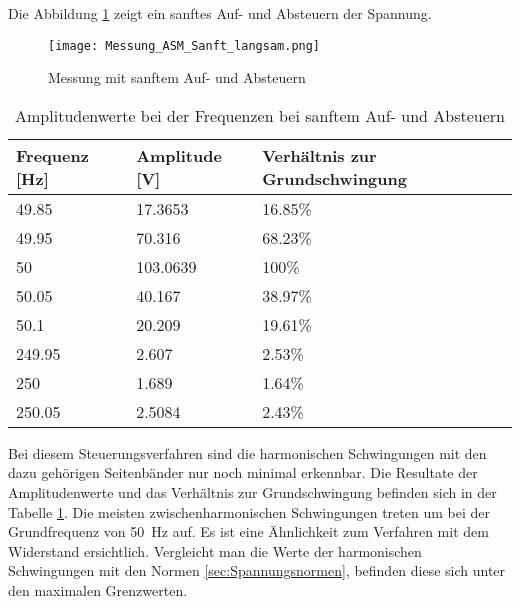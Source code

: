 Die Abbildung \ref{fig:Mess_ASM_Sanft_langsam} zeigt ein sanftes Auf- und Absteuern der Spannung.

\begin{figure}[ht!]
	\centering
	\texttt{[image: Messung\_ASM\_Sanft\_langsam.png]}	
	\caption{Messung mit sanftem Auf- und Absteuern}\label{fig:Mess_ASM_Sanft_langsam}
\end{figure}


\begin{table}[ht!]
	\centering
	\begin{tabular}{|l|l|l|}
		\hline
		Frequenz {[}Hz{]} & Amplitude {[}V{]} & Verhältnis zur Grundschwingung \\ \hline
		49.85             & 17.3653           & 16.85\%                        \\ \hline
		49.95             & 70.316            & 68.23\%                        \\ \hline
		50                & 103.0639          & 100\%                          \\ \hline
		50.05             & 40.167            & 38.97\%                        \\ \hline
		50.1              & 20.209            & 19.61\%                        \\ \hline
		249.95            & 2.607             & 2.53\%                         \\ \hline
		250               & 1.689             & 1.64\%                         \\ \hline
		250.05            & 2.5084            & 2.43\%                         \\ \hline
	\end{tabular}
\caption{Amplitudenwerte bei der Frequenzen bei sanftem Auf- und Absteuern}\label{tab:Mess_Spannung_ASM_AufAb_sanft}
\end{table}


Bei diesem Steuerungsverfahren sind die harmonischen Schwingungen mit den dazu gehörigen Seitenbänder nur noch minimal erkennbar. Die Resultate der Amplitudenwerte und das Verhältnis zur Grundschwingung befinden sich in der Tabelle \ref{tab:Mess_Spannung_ASM_AufAb_sanft}. Die meisten zwischenharmonischen Schwingungen treten um bei der Grundfrequenz von \SI{50}{Hz} auf. Es ist eine Ähnlichkeit zum Verfahren mit dem Widerstand ersichtlich. Vergleicht man die Werte der harmonischen Schwingungen mit den Normen \ref{sec:Spannungsnormen}, befinden diese sich unter den maximalen Grenzwerten. 



